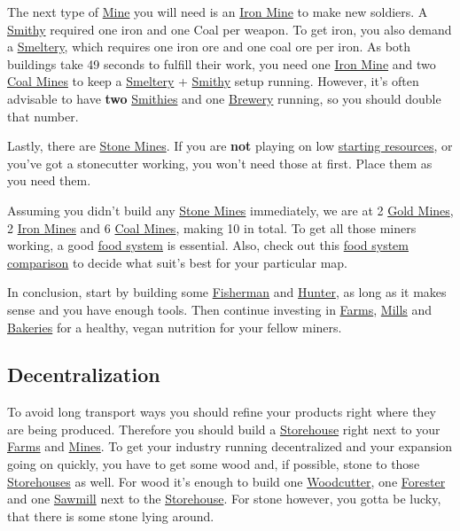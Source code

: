 \documentclass[11pt]{article}
\begin{document}
The next type of \hyperref[mine]{Mine} you will need is an \hyperref[ironmine]{Iron Mine} to make new soldiers. A \hyperref[smithy]{Smithy} required one iron and one Coal per weapon. To get iron, you also demand a \hyperref[smeltery]{Smeltery}, which requires one iron ore and one coal ore per iron. As both buildings take 49 seconds to fulfill their work, you need one \hyperref[ironmine]{Iron Mine} and two \hyperref[coalmine]{Coal Mines} to keep a \hyperref[smeltery]{Smeltery} + \hyperref[smithy]{Smithy} setup running. However, it's often advisable to have \textbf{two} \hyperref[smithy]{Smithies} and one \hyperref[brewery]{Brewery} running, so you should double that number.

Lastly, there are \hyperref[stonemine]{Stone Mines}. If you are \textbf{not} playing on low \hyperref[startresources]{starting resources}, or you've got a stonecutter working, you won't need those at first. Place them as you need them.

Assuming you didn't build any \hyperref[stonemine]{Stone Mines} immediately, we are at 2 \hyperref[goldmine]{Gold Mines}, 2 \hyperref[ironmine]{Iron Mines} and 6 \hyperref[coalmine]{Coal Mines}, making 10 in total. To get all those miners working, a good \hyperref[foodsystems]{food system} is essential. Also, check out this \hyperref[foodsystemcomparison]{food system comparison} to decide what suit's best for your particular map.

In conclusion, start by building some \hyperref[fisherman]{Fisherman} and \hyperref[hunter]{Hunter}, as long as it makes sense and you have enough tools.
Then continue investing in \hyperref[farm]{Farms}, \hyperref[mill]{Mills} and \hyperref[bakery]{Bakeries} for a healthy, vegan nutrition for your fellow miners.

\subsection{Decentralization}
\label{sec:decentralization}

To avoid long transport ways you should refine your products right where they are being produced. Therefore you should build a \hyperref[storehouse]{Storehouse} right next to your \hyperref[farm]{Farms} and \hyperref[mine]{Mines}. To get your industry running decentralized and your expansion going on quickly, you have to get some wood and, if possible, stone to those \hyperref[storehouse]{Storehouses} as well. For wood it's enough to build one \hyperref[woodcutter]{Woodcutter}, one \hyperref[forester]{Forester} and one \hyperref[sawmill]{Sawmill} next to the \hyperref[storehouse]{Storehouse}. For stone however, you gotta be lucky, that there is some stone lying around.
\end{document}
